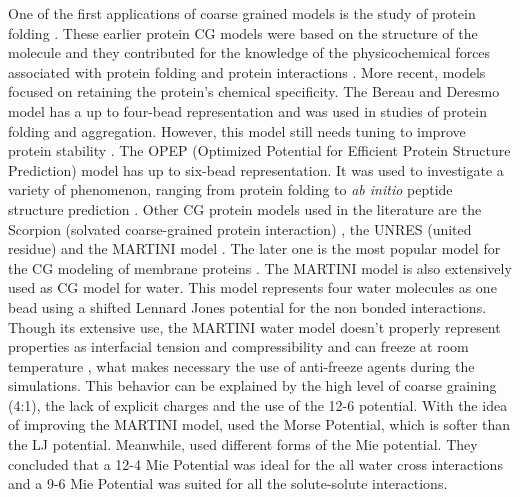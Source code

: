 One of the first applications of coarse grained models is the study of protein folding \cite{levitt1975,levitt1976}. These earlier protein CG models were based on the structure of the molecule and they contributed for the knowledge of the physicochemical forces associated with protein folding and protein interactions \cite{koga2001}.  More recent, models focused on retaining the protein's chemical specificity. The Bereau and Deresmo model \cite{bereau2009} has a up to four-bead representation and was used in studies of protein folding and aggregation. However, this model still needs tuning to improve protein stability \cite{bereau2010}. The OPEP (Optimized Potential for Efficient Protein Structure Prediction) model \cite{opep2014,opep2015} has up to six-bead representation. It was used to investigate a variety of phenomenon, ranging from protein folding to \textit{ab initio} peptide structure prediction \cite{opep2011,opep2009,opep20092}. Other CG protein models used in the literature are the Scorpion (solvated coarse-grained protein interaction)  \cite{scorpion2013}, the UNRES (united residue) \cite{unres2014} and the MARTINI model \cite{martini2013}. The later one is the most popular model for the CG modeling of membrane proteins \cite{martini20132}. The MARTINI model is also extensively used as CG model for water. This model represents four water molecules as one bead using a shifted Lennard Jones potential for the non bonded interactions. Though its extensive use, the MARTINI water model doesn't properly represent properties as interfacial tension and compressibility \cite{shinoda2010} and can freeze at room temperature \cite{winger2009,martini2007}, what makes necessary the use of anti-freeze agents during the simulations. This behavior can be explained by the high level of coarse graining (4:1), the lack of explicit charges and the use of the 12-6 potential. With the idea of improving the MARTINI model,  used the Morse Potential, which is softer than the LJ potential. Meanwhile,  used different forms of the Mie potential. They concluded that a 12-4 Mie Potential was ideal for the all water cross interactions and  a 9-6 Mie Potential was suited for all the solute-solute interactions. 

